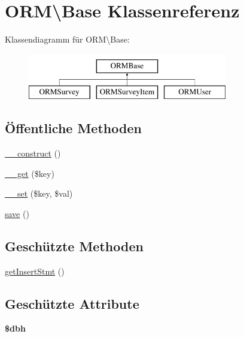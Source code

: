 \hypertarget{class_o_r_m_1_1_base}{\section{O\-R\-M\textbackslash{}Base Klassenreferenz}
\label{class_o_r_m_1_1_base}
}
Klassendiagramm für O\-R\-M\textbackslash{}Base\-:\begin{figure}[H]
\begin{center}
\leavevmode
\includegraphics[height=2.000000cm]{class_o_r_m_1_1_base}
\end{center}
\end{figure}
\subsection*{Öffentliche Methoden}
\begin{DoxyCompactItemize}
\item 
\hyperlink{class_o_r_m_1_1_base_af9d558b16cde9cc899e2e92eca6aa291}{\-\_\-\-\_\-construct} ()
\item 
\hyperlink{class_o_r_m_1_1_base_ae565838472750c09be01a7a1ea28e298}{\-\_\-\-\_\-get} (\$key)
\item 
\hyperlink{class_o_r_m_1_1_base_ae70dc3fff63316e69afe7dff77ab989c}{\-\_\-\-\_\-set} (\$key, \$val)
\item 
\hyperlink{class_o_r_m_1_1_base_abbd9e115026168bcc5c2dd7c7bed21c0}{save} ()
\end{DoxyCompactItemize}
\subsection*{Geschützte Methoden}
\begin{DoxyCompactItemize}
\item 
\hyperlink{class_o_r_m_1_1_base_ad69276f684d8ee3f5ec98b1006c42a79}{get\-Insert\-Stmt} ()
\end{DoxyCompactItemize}
\subsection*{Geschützte Attribute}
\begin{DoxyCompactItemize}
\item 
\hypertarget{class_o_r_m_1_1_base_a8656b49e90859ab436111b8e212cdbe1}{{\bfseries \$dbh}}\label{class_o_r_m_1_1_base_a8656b49e90859ab436111b8e212cdbe1}

\end{DoxyCompactItemize}


